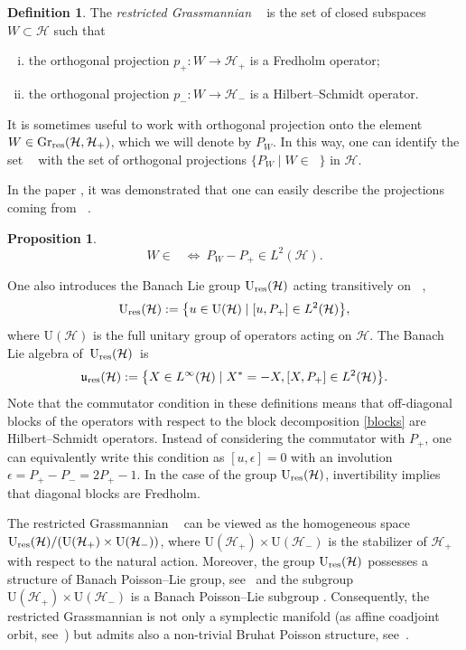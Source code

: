 \documentclass[10pt,a4paper]{amsart}
\newtheorem{prop}[thm]{Proposition}
\theoremstyle{definition}
\newtheorem{defn}[thm]{Definition}
\numberwithin{equation}{section}
\renewcommand{\H}{\mathcal{H}}
\DeclareMathOperator{\Gr}{Gr_{res}(\H,\H_+)}
\newcommand{\U}{\mathrm{U}(\H)}
\newcommand{\Up}{\mathrm{U}(\H_+)}\newcommand{\Um}{\mathrm{U}(\H_-)}
\newcommand{\Ur}{\mathrm{U}_{\textnormal{res}}(\H)}
\newcommand{\ur}{\mathfrak u_{\textnormal{res}}(\H)}
\newcommand{\Li}{L^\infty(\H)}
\newcommand{\Ld}{L^2(\H)}
\renewcommand{\to}{\rightarrow}
\newcommand{\ben}{\begin{enumerate}}
\newcommand{\een}{\end{enumerate}}
\begin{document}
\begin{defn}
The \emph{restricted Grassmannian} $\Gr$ is the set of closed subspaces ${W\subset\H}$ such that
\ben[(i)]\itemsep=0pt
\item the orthogonal projection $p_+\colon W\to \H_+$ is a Fredholm operator;
\item the orthogonal projection $p_-\colon W\to \H_-$ is a Hilbert--Schmidt operator.
\een
\end{defn}

It is sometimes useful to work with orthogonal projection onto the element $W\in \operatorname{Gr}_{\rm res}(\H, \H_+)$, which we will denote by $P_W$. In this way, one can identify the set $\Gr$ with the set of orthogonal projections $\{ P_W \mid W\in\Gr\}$ in $\H$.

In the paper \cite{spera-valli}, it was demonstrated that one can easily describe the projections coming from $\Gr$.
\begin{prop}\label{prop:gr-proj}
\[ W\in\Gr \ \Longleftrightarrow \ P_W-P_+ \in \Ld. \]
\end{prop}
One also introduces the Banach Lie group $\Ur$ acting transitively on $\Gr$,
\[
\Ur:=\bigl\{ u\in \U \mid [u,P_+]\in \Ld\bigr\},
\]
where $\U$ is the full unitary group of operators acting on $\H$. The Banach Lie algebra of~$\Ur$~is
\[
\ur:=\bigl\{ X\in \Li \mid X^* = -X, [X,P_+]\in \Ld\bigr\}.\]
Note that the commutator condition in these definitions means that off-diagonal blocks of the operators with respect to the block decomposition \eqref{blocks} are Hilbert--Schmidt operators. Instead of considering the commutator with $P_+$, one can equivalently write this condition as $[u, \epsilon] = 0$ with an involution $\epsilon = P_+-P_- = 2P_+-1$. In the case of the group $\Ur$, invertibility implies that diagonal blocks are Fredholm.

The restricted Grassmannian $\Gr$ can be viewed as the homogeneous space $\Ur/\allowbreak(\Up\times\Um)$, where $\Up\times\Um$ is the stabilizer of $\H_+$ with respect to the natural action.
Moreover, the group $\Ur$ possesses a structure of Banach Poisson--Lie group, see~\cite[Theorem 7.12]{tumpach-bruhat} and the subgroup $\Up\times\Um$ is a Banach Poisson--Lie
subgroup \cite[Proposition 8.2]{tumpach-bruhat}. Consequently, the restricted Grassmannian is not only a symplectic manifold (as affine coadjoint orbit, see~\cite{Ratiu-grass}) but admits also a non-trivial Bruhat Poisson structure, see~\cite[Theorem 8.3]{tumpach-bruhat}.
\end{document}
